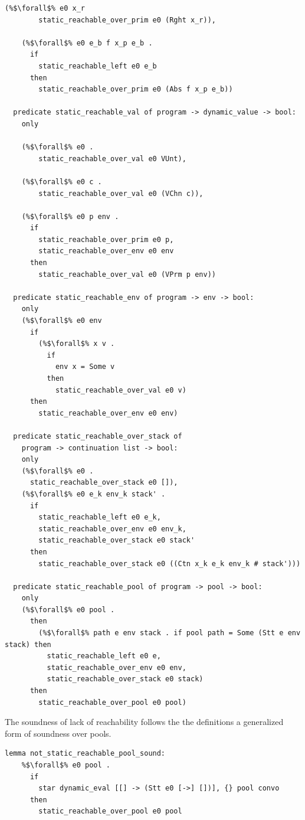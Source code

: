 \documentclass{article}
\begin{document}
\begin{lstlisting}[language=logic, escapechar=\%]
    (%$\forall$% e0 x_r
        static_reachable_over_prim e0 (Rght x_r)),

    (%$\forall$% e0 e_b f x_p e_b . 
      if
        static_reachable_left e0 e_b 
      then
        static_reachable_over_prim e0 (Abs f x_p e_b))

  predicate static_reachable_val of program -> dynamic_value -> bool:
    only

    (%$\forall$% e0 .
        static_reachable_over_val e0 VUnt),

    (%$\forall$% e0 c .
        static_reachable_over_val e0 (VChn c)),

    (%$\forall$% e0 p env .
      if
        static_reachable_over_prim e0 p, 
        static_reachable_over_env e0 env
      then
        static_reachable_over_val e0 (VPrm p env))

  predicate static_reachable_env of program -> env -> bool:
    only
    (%$\forall$% e0 env
      if
        (%$\forall$% x v .
          if
            env x = Some v
          then
            static_reachable_over_val e0 v)
      then
        static_reachable_over_env e0 env)

  predicate static_reachable_over_stack of
    program -> continuation list -> bool:
    only
    (%$\forall$% e0 .
      static_reachable_over_stack e0 []),
    (%$\forall$% e0 e_k env_k stack' .
      if
        static_reachable_left e0 e_k, 
        static_reachable_over_env e0 env_k,
        static_reachable_over_stack e0 stack' 
      then
        static_reachable_over_stack e0 ((Ctn x_k e_k env_k # stack')))

  predicate static_reachable_pool of program -> pool -> bool:
    only
    (%$\forall$% e0 pool .
      then
        (%$\forall$% path e env stack . if pool path = Some (Stt e env stack) then 
          static_reachable_left e0 e, 
          static_reachable_over_env e0 env, 
          static_reachable_over_stack e0 stack)
      then
        static_reachable_over_pool e0 pool)

  \end{lstlisting}

The soundness of lack of reachability follows the the definitions
a generalized form of soundness over pools.

\begin{lstlisting}[language=logic, escapechar=\%]
  lemma not_static_reachable_pool_sound:
    %$\forall$% e0 pool .
      if
        star dynamic_eval [[] -> (Stt e0 [->] [])], {} pool convo 
      then
        static_reachable_over_pool e0 pool

  \end{lstlisting}
\end{document}
